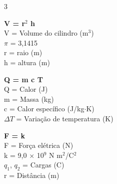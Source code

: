 \documentclass[a4paper,landscape]{article}
\begin{document}
\begin{multicols}{3}

\textbf{V = \pi r$^2$ h} \\
V = Volume do cilindro (m$^3$) \\
$\pi$ = 3,1415 \\
r = raio (m) \\
h = altura (m) \\
\vspace{1em}

\textbf{Q = m c \Delta T} \\
Q = Calor (J) \\
m = Massa (kg) \\
c = Calor específico (J/kg$\cdot$K) \\
$\Delta T$ = Variação de temperatura (K) \\
\vspace{1em}

\textbf{F = k } \\
F = Força elétrica (N) \\
k = 9,0 $\times$ 10$^9$ N m$^2$/C$^2$ \\
$q_1$, $q_2$ = Cargas (C) \\
r = Distância (m) \\
\vspace{1em}

\end{multicols}
\end{document}
